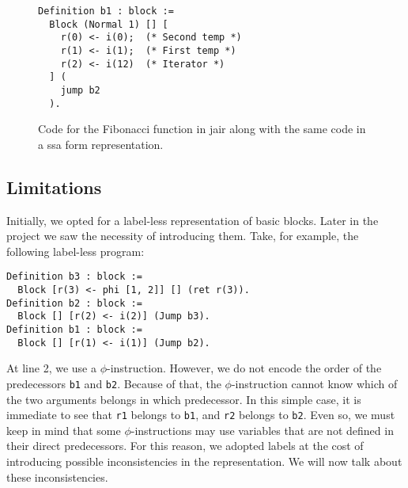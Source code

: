 \begin{figure}[ht]
\begin{minipage}{0.65\textwidth}
\begin{lstlisting}[style=Rocq]
Definition b1 : block :=
  Block (Normal 1) [] [
    r(0) <- i(0);  (* Second temp *)
    r(1) <- i(1);  (* First temp *)
    r(2) <- i(12)  (* Iterator *)
  ] (
    jump b2
  ).
\end{lstlisting}
\end{minipage}
\hfill
\begin{minipage}{0.30\textwidth}
\centering
{}
\end{minipage}
\caption{Code for the Fibonacci function in \gls{jair} along with the same code in a \gls{ssa} form representation.}
\label{fig:example-jair}
\end{figure}

\subsection{Limitations}
\label{subsec:limitations}

Initially, we opted for a label-less representation of basic blocks.
Later in the project we saw the necessity of introducing them. Take, for example, the following label-less program:

\begin{lstlisting}[style=Rocq]
Definition b3 : block :=
  Block [r(3) <- phi [1, 2]] [] (ret r(3)).
Definition b2 : block :=
  Block [] [r(2) <- i(2)] (Jump b3).
Definition b1 : block :=
  Block [] [r(1) <- i(1)] (Jump b2).
\end{lstlisting}

At line 2, we use a $\phi$-instruction. However, we do not encode the order of the predecessors \texttt{b1} and \texttt{b2}. Because of that, the $\phi$-instruction cannot know which of the two arguments belongs in which predecessor. In this simple case, it is immediate to see that \texttt{r1} belongs to \texttt{b1}, and \texttt{r2} belongs to \texttt{b2}. Even so, we must keep in mind that some $\phi$-instructions may use variables that are not defined in their direct predecessors. For this reason, we adopted labels at the cost of introducing possible inconsistencies in the representation. We will now talk about these inconsistencies.

